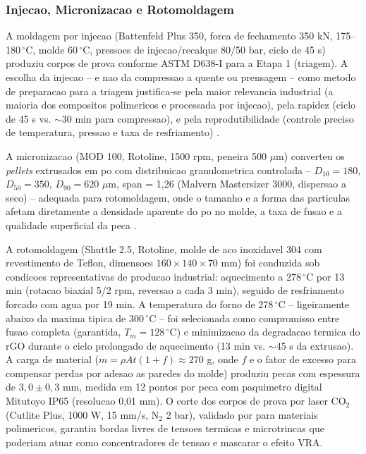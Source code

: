 \documentclass[11pt,a4paper,oneside]{article}
\begin{document}
\subsubsection{Injecao, Micronizacao e Rotomoldagem}

A moldagem por injecao (Battenfeld Plus 350, forca de fechamento 350 kN, 175--180$\,^{\circ}$C,
molde 60$\,^{\circ}$C, pressoes de injecao/recalque 80/50 bar, ciclo de 45 s) produziu corpos
de prova conforme ASTM D638-I para a Etapa 1 (triagem). A escolha da injecao -- e nao da
compressao a quente ou prensagem -- como metodo de preparacao para a triagem justifica-se pela
maior relevancia industrial (a maioria dos compositos polimericos e processada por injecao),
pela rapidez (ciclo de 45 s vs. ${\sim}$30 min para compressao), e pela reprodutibilidade
(controle preciso de temperatura, pressao e taxa de resfriamento) \cite{Montgomery2020}.

A micronizacao (MOD 100, Rotoline, 1500 rpm, peneira 500 $\mu$m) converteu os \textit{pellets}
extrusados em po com distribuicao granulometrica controlada -- $D_{10}{=}180$, $D_{50}{=}350$,
$D_{90}{=}620$ $\mu$m, span = 1,26 (Malvern Mastersizer 3000, dispersao a seco) -- adequada
para rotomoldagem, onde o tamanho e a forma das particulas afetam diretamente a densidade
aparente do po no molde, a taxa de fusao e a qualidade superficial da peca \cite{Islabao2005}.

A rotomoldagem (Shuttle 2.5, Rotoline, molde de aco inoxidavel 304 com revestimento de
Teflon\textregistered, dimensoes $160{\times}140{\times}70$ mm) foi conduzida sob condicoes
representativas de producao industrial: aquecimento a 278$\,^{\circ}$C por 13 min (rotacao
biaxial 5/2 rpm, reversao a cada 3 min), seguido de resfriamento forcado com agua por 19 min.
A temperatura do forno de 278$\,^{\circ}$C -- ligeiramente abaixo da maxima tipica de
300$\,^{\circ}$C -- foi selecionada como compromisso entre fusao completa (garantida,
$T_m{=}128\,^{\circ}$C) e minimizacao da degradacao termica do rGO durante o ciclo prolongado
de aquecimento (13 min vs. ${\sim}$45 s da extrusao). A carga de material ($m{=}\rho A t
(1{+}f){\approx}270$ g, onde $f$ e o fator de excesso para compensar perdas por adesao as
paredes do molde) produziu pecas com espessura de $3{,}0{\pm}0{,}3$ mm, medida em 12 pontos
por peca com paquimetro digital Mitutoyo IP65 (resolucao 0,01 mm). O corte dos corpos de prova
por laser CO$_2$ (Cutlite Plus, 1000 W, 15 mm/s, N$_2$ 2 bar), validado por
\citet{Davim2008} para materiais polimericos, garantiu bordas livres de tensoes termicas e
microtrincas que poderiam atuar como concentradores de tensao e mascarar o efeito VRA.
\end{document}
